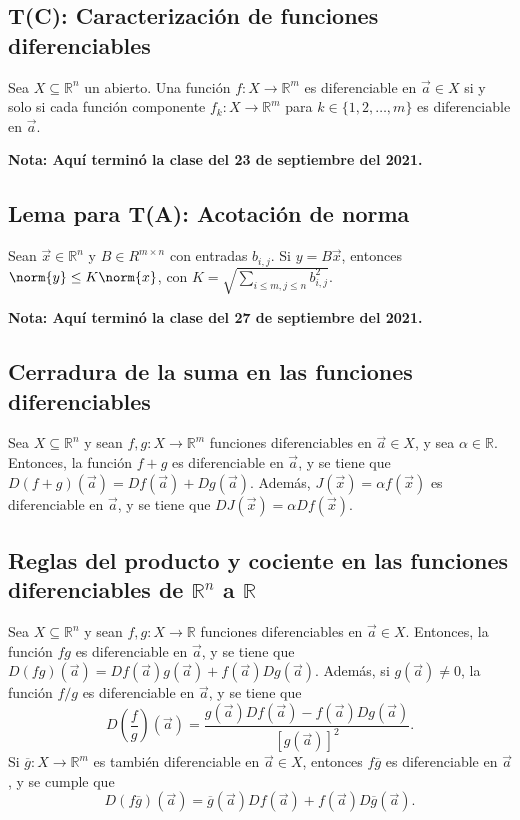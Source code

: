 \documentclass{article}
\begin{document}
\subsection*{T(C): Caracterización de funciones diferenciables}

Sea $X\subseteq\mathbb{R}^n$ un abierto. Una función $f:X\to\mathbb{R}^m$ es diferenciable en $\vec{a}\in X$ si y solo si cada función componente $f_k:X\to \mathbb{R}^m$ para $k\in\{1,2,\ldots,m\}$ es diferenciable en $\vec{a}$.

\vspace{10pt}
\textbf{Nota: Aquí terminó la clase del 23 de septiembre del 2021.}

\subsection*{Lema para T(A): Acotación de norma}

Sean $\vec{x}\in\mathbb{R}^n$ y $B\in R^{m\times n}$ con entradas $b_{i,j}$. Si $y=B\vec{x}$, entonces $\norm{y}\leq K\norm{x}$, con $K=\displaystyle\sqrt{\sum_{i\leq m,j\leq n}b_{i,j}^2}$.

\vspace{10pt}
\textbf{Nota: Aquí terminó la clase del 27 de septiembre del 2021.}

\subsection*{Cerradura de la suma en las funciones diferenciables}

Sea $X\subseteq\mathbb{R}^n$ y sean $f,g: X\to\mathbb{R}^m$ funciones diferenciables en $\vec{a}\in X$, y sea $\alpha\in\mathbb{R}$. Entonces, la función $f+g$ es diferenciable en $\vec{a}$, y se tiene que $D(f+g)(\vec{a})=Df(\vec{a})+Dg(\vec{a})$. Además, $J(\vec{x})=\alpha f(\vec{x})$ es diferenciable en $\vec{a}$, y se tiene que $DJ(\vec{x})=\alpha Df(\vec{x})$.

\subsection*{Reglas del producto y cociente en las funciones diferenciables de $\mathbb{R}^n$ a $\mathbb{R}$}

Sea $X\subseteq\mathbb{R}^n$ y sean $f,g: X\to\mathbb{R}$ funciones diferenciables en $\vec{a}\in X$. Entonces, la función $fg$ es diferenciable en $\vec{a}$, y se tiene que $D(fg)(\vec{a})=Df(\vec{a})g(\vec{a})+f(\vec{a})Dg(\vec{a})$. Además, si $g(\vec{a})\neq0$, la función $f/g$ es diferenciable en $\vec{a}$, y se tiene que
$$D\left(\frac{f}{g}\right)(\vec{a})=\frac{g(\vec{a})Df(\vec{a})-f(\vec{a})Dg(\vec{a})}{[g(\vec{a})]^2}.$$
Si $\overline{g}:X\to\mathbb{R}^m$ es también diferenciable en $\vec{a}\in X$, entonces $f\overline{g}$ es diferenciable en $\vec{a}$, y se cumple que 
$$D(f\overline{g})(\vec{a})=\overline{g}(\vec{a})Df(\vec{a})+f(\vec{a})D\overline{g}(\vec{a}).$$ 
\end{document}
